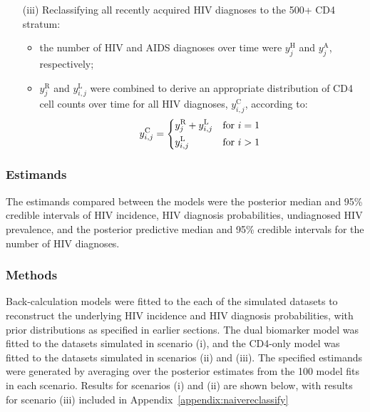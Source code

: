 \begin{enumerate}
  \item[(iii)] Reclassifying all recently acquired HIV diagnoses to the 500+ CD4 stratum:
        \begin{itemize}
          \item the number of HIV and AIDS diagnoses over time were $y^\text{H}_j$ and $y^\text{A}_j$, respectively;
          \item $y^\text{R}_{j}$ and $y^\text{L}_{i,j}$ were combined to derive an appropriate distribution of CD4 cell counts over time for all HIV diagnoses, $y^\text{C}_{i,j}$, according to:
                \[
                  y^\text{C}_{i,j} =
                  \begin{dcases*}
                    y^\text{R}_{j} + y^\text{L}_{i,j} & for $i = 1$ \\
                    y^\text{L}_{i,j}                  & for $i > 1$
                  \end{dcases*}
                \]
        \end{itemize}

\end{enumerate}

\subsubsection{Estimands}

The estimands compared between the models were the posterior median and 95\% credible intervals of HIV incidence, HIV diagnosis probabilities, undiagnosed HIV prevalence, and the posterior predictive median and 95\% credible intervals for the number of HIV diagnoses.

\subsubsection{Methods}

Back-calculation models were fitted to the each of the simulated datasets to reconstruct the underlying HIV incidence and HIV diagnosis probabilities, with prior distributions as specified in earlier sections. The dual biomarker model was fitted to the datasets simulated in scenario (i), and the CD4-only model was fitted to the datasets simulated in scenarios (ii) and (iii). The specified estimands were generated by averaging over the posterior estimates from the 100 model fits in each scenario. Results for scenarios (i) and (ii) are shown below, with results for scenario (iii) included in Appendix~\ref{appendix:naivereclassify}

